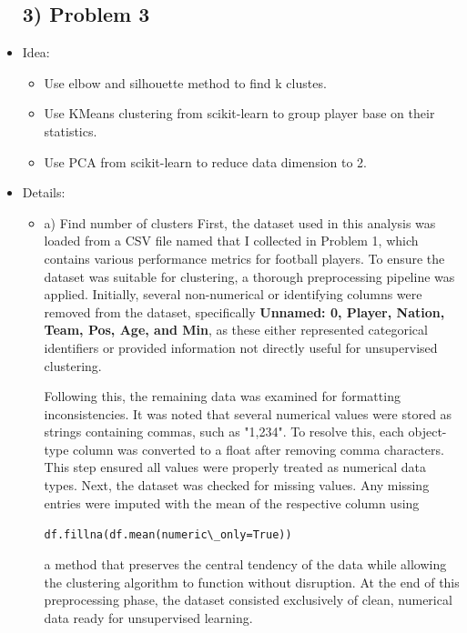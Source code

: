 \documentclass[a4paper,12pt]{article}
\begin{document}
\begin{itemize}[label= {*}, leftmargin= 1cm]
    \subsection*{3) Problem 3}
    \item {\Large Idea:}
    \begin{itemize}[label= {-}, leftmargin= 1cm]
        \item Use elbow and silhouette method to find k clustes.
        \item Use KMeans clustering from scikit-learn to group player base on their statistics.
        \item Use PCA from scikit-learn to reduce data dimension to 2.
    \end{itemize}
    \item {\Large Details:}
    \begin{itemize}[label= {}, leftmargin= 1cm]
        \item a) Find number of clusters
        First, the dataset used in this analysis was loaded from a CSV file named that I collected in Problem 1, which contains various performance metrics for football players. To ensure the dataset was suitable for clustering, a thorough preprocessing pipeline was applied. Initially, several non-numerical or identifying columns were removed from the dataset, specifically \textbf{Unnamed: 0, Player, Nation, Team, Pos, Age, and Min}, as these either represented categorical identifiers or provided information not directly useful for unsupervised clustering.

        Following this, the remaining data was examined for formatting inconsistencies. It was noted that several numerical values were stored as strings containing commas, such as "1,234". To resolve this, each object-type column was converted to a float after removing comma characters. This step ensured all values were properly treated as numerical data types. Next, the dataset was checked for missing values. Any missing entries were imputed with the mean of the respective column using
        
        \vspace{0.1cm}
        \verb|df.fillna(df.mean(numeric\_only=True))|
        \vspace{0.1cm}
        
        a method that preserves the central tendency of the data while allowing the clustering algorithm to function without disruption. At the end of this preprocessing phase, the dataset consisted exclusively of clean, numerical data ready for unsupervised learning.


\end{itemize}
\end{itemize}
\end{document}
